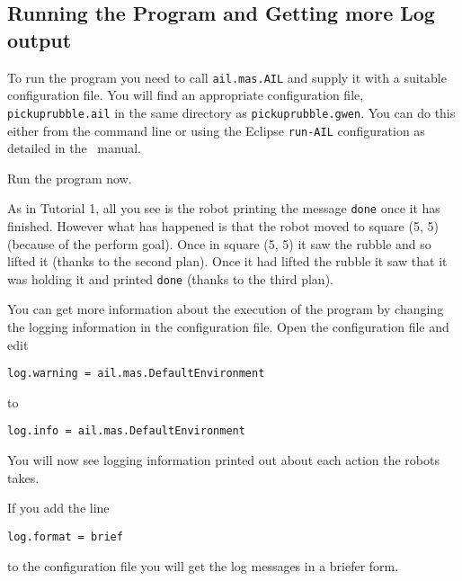 \subsection{Running the Program and Getting more Log output}

\begin{sloppypar}
To run the program you need to call \texttt{ail.mas.AIL} and supply it with a suitable configuration file.  You will find an appropriate configuration file, \texttt{pickuprubble.ail} in the same directory as \texttt{pickuprubble.gwen}.  You can do this either from the command line or using the Eclipse \texttt{run-AIL} configuration as detailed in the \mcapl\ manual.
\end{sloppypar}

Run the program now.

As in Tutorial 1, all you see is the robot printing the message \lstinline{done} once it has finished.  However what has happened is that the robot moved to square (5, 5) (because of the perform goal).  Once in square (5, 5) it saw the rubble and so lifted it (thanks to the second plan).  Once it had lifted the rubble it saw that it was holding it and printed \lstinline{done} (thanks to the third plan).

You can get more information about the execution of the program by changing the logging information in the configuration file.  Open the configuration file and edit
\begin{verbatim}
log.warning = ail.mas.DefaultEnvironment
\end{verbatim}
to
\begin{verbatim}
log.info = ail.mas.DefaultEnvironment
\end{verbatim}
You will now see logging information printed out about each action the robots takes.

If you add the line
\begin{verbatim}
log.format = brief
\end{verbatim}
to the configuration file you will get the log messages in a briefer form.


